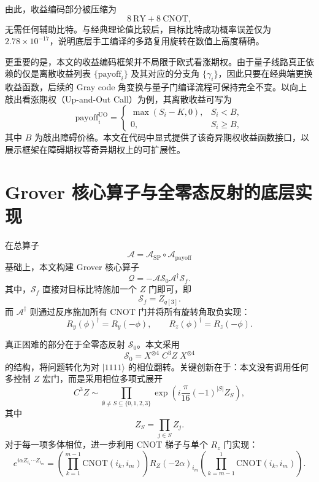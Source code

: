 \documentclass[12pt,a4paper]{ctexart}
\begin{document}
由此，收益编码部分被压缩为
\begin{equation}
8\ \mathrm{RY} + 8\ \mathrm{CNOT},
\end{equation}
无需任何辅助比特。与经典理论值比较后，目标比特成功概率误差仅为 $2.78\times 10^{-17}$，说明底层手工编译的多路复用旋转在数值上高度精确。

更重要的是，本文的收益编码框架并不局限于欧式看涨期权。由于量子线路真正依赖的仅是离散收益列表 $\{\mathrm{payoff}_i\}$ 及其对应的分支角 $\{\gamma_i\}$，因此只要在经典端更换收益函数，后续的 Gray code 角变换与量子门编译流程可保持完全不变。以向上敲出看涨期权（Up-and-Out Call）为例，其离散收益可写为
\begin{equation}
\mathrm{payoff}^{\mathrm{UO}}_i=
\begin{cases}
\max(S_i-K,0), & S_i < B,\\
0, & S_i \ge B,
\end{cases}
\end{equation}
其中 $B$ 为敲出障碍价格。本文在代码中显式提供了该奇异期权收益函数接口，以展示框架在障碍期权等奇异期权上的可扩展性。

\section{Grover 核心算子与全零态反射的底层实现}
在总算子
\begin{equation}
\mathcal{A}=\mathcal{A}_{\mathrm{SP}}\circ\mathcal{A}_{\mathrm{payoff}}
\end{equation}
基础上，本文构建 Grover 核心算子
\begin{equation}
\mathcal{Q}=-\mathcal{A}\mathcal{S}_0\mathcal{A}^{\dagger}\mathcal{S}_f.
\end{equation}
其中，$\mathcal{S}_f$ 直接对目标比特施加一个 $Z$ 门即可，即
\begin{equation}
\mathcal{S}_f = Z_{q[3]}.
\end{equation}
而 $\mathcal{A}^{\dagger}$ 则通过反序施加所有 CNOT 门并将所有旋转角取负实现：
\begin{equation}
R_y(\phi)^{\dagger}=R_y(-\phi),\qquad
R_z(\phi)^{\dagger}=R_z(-\phi).
\end{equation}

真正困难的部分在于全零态反射 $\mathcal{S}_0$。本文采用
\begin{equation}
\mathcal{S}_0 = X^{\otimes 4}\;C^3Z\;X^{\otimes 4}
\end{equation}
的结构，将问题转化为对 $|1111\rangle$ 的相位翻转。关键创新在于：本文没有调用任何多控制 $Z$ 宏门，而是采用相位多项式展开
\begin{equation}
C^3Z \sim \prod_{\emptyset\neq S\subseteq\{0,1,2,3\}}
\exp\!\left(i\frac{\pi}{16}(-1)^{|S|}Z_S\right),
\end{equation}
其中
\begin{equation}
Z_S=\prod_{j\in S}Z_j.
\end{equation}
对于每一项多体相位，进一步利用 CNOT 梯子与单个 $R_z$ 门实现：
\begin{equation}
e^{i\alpha Z_{i_1}\cdots Z_{i_m}}
=
\left(\prod_{k=1}^{m-1}\mathrm{CNOT}(i_k,i_m)\right)
R_Z(-2\alpha)_{i_m}
\left(\prod_{k=m-1}^{1}\mathrm{CNOT}(i_k,i_m)\right).
\end{equation}
\end{document}
